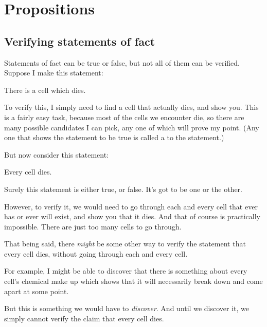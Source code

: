 \documentclass[../../../main.tex]{subfiles}
\begin{document}
\chapter{Propositions}


\section{Verifying statements of fact}

Statements of fact can be true or false, but not all of them can be verified. Suppose I make this statement:

\begin{center}
  There is a cell which dies.
\end{center}

\noindent
To verify this, I simply need to find a cell that actually dies, and show you. This is a fairly easy task, because most of the cells we encounter die, so there are many possible candidates I can pick, any one of which will prove my point. (Any one that shows the statement to be true is called a  to the statement.)

But now consider this statement:

\begin{center}
  Every cell dies.
\end{center}

\noindent
Surely this statement is either true, or false. It's got to be one or the other.

However, to verify it, we would need to go through each and every cell that ever has or ever will exist, and show you that it dies. And that of course is practically impossible. There are just too many cells to go through.

That being said, there \emph{might} be some other way to verify the statement that every cell dies, without going through each and every cell. 

For example, I might be able to discover that there is something about every cell's chemical make up which shows that it will necessarily break down and come apart at some point. 

But this is something we would have to \emph{discover}. And until we discover it, we simply cannot verify the claim that every cell dies.
\end{document}
